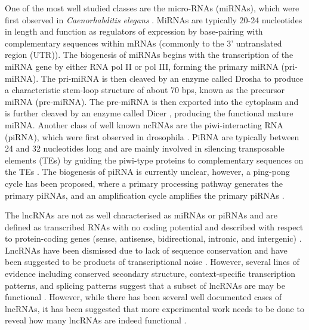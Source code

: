 One of the most well studied classes are the micro-RNAs (miRNAs), which were first observed in \textit{Caenorhabditis elegans} \citep{pmid8252621}. MiRNAs are typically 20-24 nucleotides in length and function as regulators of expression by base-pairing with complementary sequences within mRNAs (commonly to the 3' untranslated region (UTR)). The biogenesis of miRNAs begins with the transcription of the miRNA gene by either RNA pol II or pol III, forming the primary miRNA (pri-miRNA). The pri-miRNA is then cleaved by an enzyme called Drosha \citep{pmid14508493} to produce a characteristic stem-loop structure of about 70 bps, known as the precursor miRNA (pre-miRNA). The pre-miRNA is then exported into the cytoplasm and is further cleaved by an enzyme called Dicer \citep{pmid11201747}, producing the functional mature miRNA. Another class of well known ncRNAs are the piwi-interacting RNA (piRNA), which were first observed in drosophila \citep{pmid11470406}. PiRNA are typically between 24 and 32 nucleotides long and are mainly involved in silencing transposable elements (TEs) by guiding the piwi-type proteins to complementary sequences on the TEs \citep{pmid18282709}. The biogenesis of piRNA is currently unclear, however, a ping-pong cycle has been proposed, where a primary processing pathway generates the primary piRNAs, and an amplification cycle amplifies the primary piRNAs \citep{pmid21427766}.

The lncRNAs are not as well characterised as miRNAs or piRNAs and are defined as transcribed RNAs with no coding potential and described with respect to protein-coding genes (sense, antisense, bidirectional, intronic, and intergenic) \citep{pmid19239885}. LncRNAs have been dismissed due to lack of sequence conservation \citep{pmid15495343} and have been suggested to be products of transcriptional noise \citep{pmid15851066}. However, several lines of evidence including conserved secondary structure, context-specific transcription patterns, and splicing patterns suggest that a subset of lncRNAs are may be functional \citep{pmid19188922}. However, while there has been several well documented cases of lncRNAs, it has been suggested that more experimental work needs to be done to reveal how many lncRNAs are indeed functional \citep{pmid23463798}.

